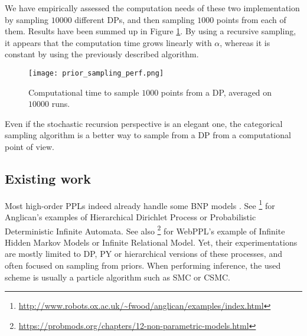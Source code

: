 We have empirically assessed the computation needs of these two implementation by sampling $10000$ different \glspl{DP}, and then sampling $1000$ points from each of them. Results have been summed up in Figure \ref{fig:prior_sampling_perf}. By using a recursive sampling, it appears that the computation time grows linearly with $\alpha$, whereas it is constant by using the previously described algorithm.

\begin{figure}[h!]
\centering
    \texttt{[image: prior\_sampling\_perf.png]} 
    \caption{Computational time to sample $1000$ points from a \gls{DP}, averaged on $10000$ runs.}
    \label{fig:prior_sampling_perf} 
\end{figure}

Even if the stochastic recursion perspective is an elegant one, the categorical sampling algorithm is a better way to sample from a \gls{DP} from a computational point of view.



\subsection{Existing work}

Most high-order \glspl{PPL} indeed already handle some \gls{BNP} models \cite{Goodman:2012uq,wood-aistats-2014,probmods2}.
See \footnote{\url{http://www.robots.ox.ac.uk/~fwood/anglican/examples/index.html}} for Anglican's examples of Hierarchical Dirichlet Process or Probabilistic Deterministic Infinite Automata. See also \footnote{\url{https://probmods.org/chapters/12-non-parametric-models.html}} for WebPPL's example of Infinite Hidden Markov Models or Infinite Relational Model.
Yet, their experimentations are mostly limited to \acrlong{DP}, \acrlong{PY} or hierarchical versions of these processes, and often focused on sampling from priors. When performing inference,
the used scheme is usually a particle algorithm such as \acrlong{SMC} or \acrlong{CSMC}.


